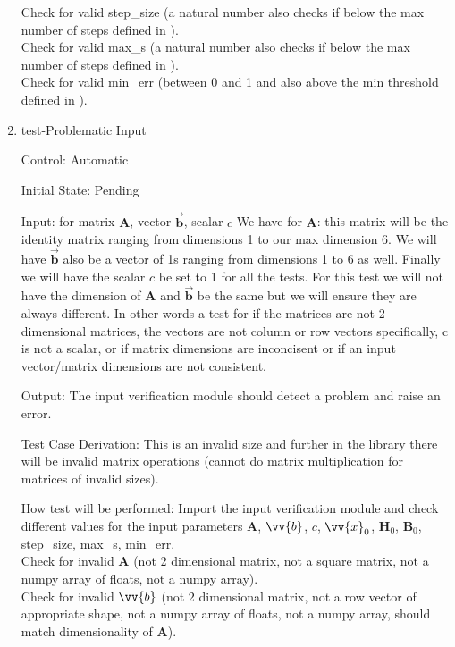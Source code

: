 \documentclass[12pt, titlepage]{article}
\begin{document}
\begin{enumerate}
\noindent Check for valid step\_size (a natural number also checks if below the max number of steps defined in \citep{SRS}).  
\\

\noindent Check for valid max\_s (a natural number also checks if below the max number of steps defined in \citep{SRS}).  
\\

\noindent Check for valid min\_err (between 0 and 1 and also above the min threshold defined in \citep{SRS}).  
\\
					
\item{test-Problematic Input\\}

Control: Automatic
					
Initial State: Pending
					
Input: for matrix $\mathbf{A}$, vector $\mathbf{\vec{b}}$, scalar $c$
We have for $\mathbf{A}$: this matrix will be the identity matrix ranging 
from dimensions 1 to our max dimension 6. We will have $\mathbf{\vec{b}}$
also be a vector of 1s ranging from dimensions 1 to 6 as well. Finally we 
will have the scalar $c$ be set to 1 for all the tests. For this test we 
will not have the dimension of $\mathbf{A}$ and $\mathbf{\vec{b}}$ be the same
but we will ensure they are always different. In other words a test for if the matrices are not 2 dimensional matrices, the vectors are not column or row vectors specifically, c is not a scalar, or if matrix dimensions are inconcisent or if an input vector/matrix dimensions are not consistent.
					
Output: The input verification module should detect a problem and raise an error.

Test Case Derivation: This is an invalid size and further in the library there will be invalid 
matrix operations (cannot do matrix multiplication for matrices of invalid sizes).

How test will be performed: Import the input verification module and check different values for the input parameters $\mathbf{A}$, $\vv{b}$, $c$, $\vv{x}_0$, $\mathbf{H}_0$, $\mathbf{B}_0$, step\_size, max\_s, min\_err.
\\

\noindent Check for invalid $\mathbf{A}$ (not 2 dimensional matrix, not a square matrix, not a numpy array of floats, not a numpy array).  
\\

\noindent Check for invalid $\vv{b}$ (not 2 dimensional matrix, not a row vector of appropriate shape, not a numpy array of floats, not a numpy array, should match dimensionality of $\mathbf{A}$).
\\


\end{enumerate}
\end{document}
